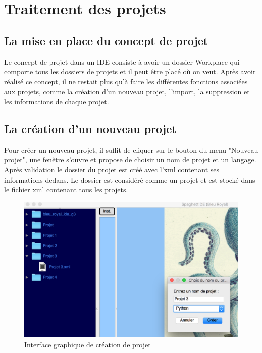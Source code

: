 \documentclass[a4paper,12pt]{article}
\begin{document}
\section{Traitement des projets}

\subsection{La mise en place du concept de projet}

Le concept de projet dans un IDE consiste à avoir un dossier Workplace qui comporte tous les dossiers de projets et il peut être placé où on veut. Après avoir réalisé ce concept, il ne restait plus qu'à faire les différentes fonctions associées aux projets, comme la création d'un nouveau projet, l'import, la suppression et les informations de chaque projet.

	
\subsection{La création d'un nouveau projet}
		
Pour créer un nouveau projet, il suffit de cliquer sur le bouton du menu "Nouveau projet", une fenêtre s'ouvre et propose de choisir un nom de projet et un langage. Après validation le dossier du projet est créé avec l'xml contenant ses informations dedans. Le dossier est considéré comme un projet et est stocké dans le fichier xml contenant tous les projets.

\begin{figure}[h!]
			\begin{center}
				\includegraphics[scale=0.4]{images/imgs_projet/creation_project.png}
				\caption{Interface graphique de création de projet}
			\end{center}
		\end{figure}
		
\end{document}
